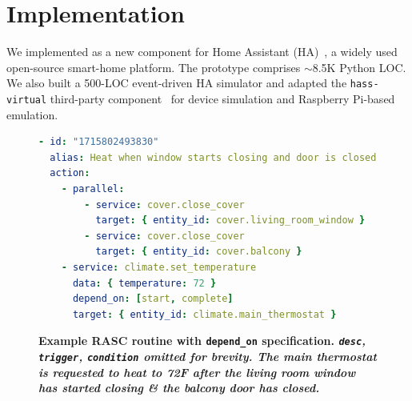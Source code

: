 \section{Implementation}

We implemented \sysname{} as a new component for Home Assistant (HA)~\cite{HAcore}, a widely used open-source smart-home platform. The prototype comprises \(\sim\)8.5K Python LOC. 
We also built a 500-LOC event-driven HA simulator and adapted the \texttt{hass-virtual} third-party component~\cite{hassvirtual} for device simulation and Raspberry Pi-based emulation.


\begin{figure}[t]
\centering
\begin{minipage}{\linewidth}
\begin{lstlisting}[style=codeblock,language=yaml]
- id: "1715802493830"
  alias: Heat when window starts closing and door is closed
  action:
    - parallel:
        - service: cover.close_cover
          target: { entity_id: cover.living_room_window }
        - service: cover.close_cover
          target: { entity_id: cover.balcony }
    - service: climate.set_temperature
      data: { temperature: 72 }
      depend_on: [start, complete]
      target: { entity_id: climate.main_thermostat }
\end{lstlisting}
\vspace{-0.5cm}
\caption{\bf \small Example RASC routine with \texttt{depend\_on} specification. 
{\it \texttt{desc}, \texttt{trigger},  \texttt{condition} omitted for brevity. The main thermostat is requested to heat to 72\textdegree F after the living room window has started closing \& the balcony door has closed.
}}
\vspace{-0.5cm}
\label{lst:script-example}
\end{minipage}
\end{figure}

